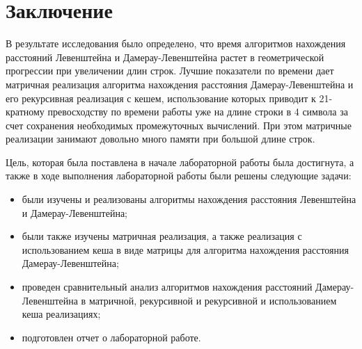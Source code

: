 \chapter*{Заключение}

В результате исследования было определено, что время алгоритмов нахождения расстояний Левенштейна и Дамерау-Левенштейна растет в геометрической прогрессии при увеличении длин строк. Лучшие показатели по времени дает матричная реализация алгоритма нахождения расстояния Дамерау-Левенштейна и его рекурсивная реализация с кешем, использование которых приводит к 21-кратному превосходству по времени работы уже на длине строки в 4 символа за счет сохранения необходимых промежуточных вычислений. При этом матричные реализации занимают довольно много памяти при большой длине строк. 


Цель, которая была поставлена в начале лабораторной работы была достигнута, а также в ходе выполнения лабораторной работы были решены следующие задачи:

\begin{itemize}
	\item были изучены и реализованы алгоритмы нахождения расстояния Левенштейна и Дамерау-Левенштейна;
	\item были также изучены матричная реализация, а также реализация с использованием кеша в виде матрицы для алгоритма нахождения расстояния Дамерау-Левенштейна;
    \item проведен сравнительный анализ алгоритмов нахождения расстояний Дамерау-Левенштейна в матричной, рекурсивной и рекурсивной и использованием кеша реализациях;
	\item подготовлен отчет о лабораторной работе.
\end{itemize}